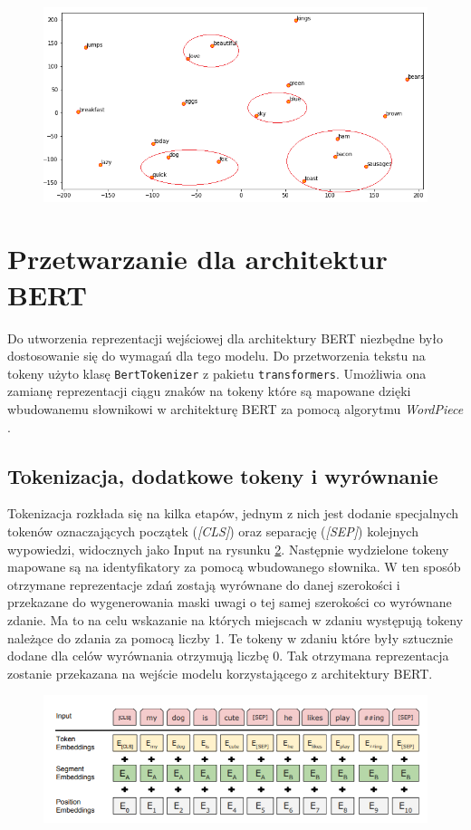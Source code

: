 \begin{figure}[t]
\centering\includegraphics[width=\textwidth]{figures/visualize_glove.png}
\label{rys:visualize_glove}
\end{figure}

\section{Przetwarzanie dla architektur BERT}
\label{section:przetwarzanie_danych_bert}

Do utworzenia reprezentacji wejściowej dla architektury BERT niezbędne było dostosowanie się do wymagań dla tego modelu. Do przetworzenia tekstu na tokeny użyto klasę \texttt{BertTokenizer} z pakietu \texttt{transformers}. Umożliwia ona zamianę reprezentacji ciągu znaków na tokeny które są mapowane dzięki wbudowanemu słownikowi w architekturę BERT za pomocą algorytmu \textit{WordPiece} \cite{wu2016googles}.

\subsection{Tokenizacja, dodatkowe tokeny i wyrównanie}

Tokenizacja rozkłada się na kilka etapów, jednym z nich jest dodanie specjalnych tokenów oznaczających początek (\textit{[CLS]}) oraz separację (\textit{[SEP]}) kolejnych wypowiedzi, widocznych jako Input na rysunku \ref{rys:bert_token}. Następnie wydzielone tokeny mapowane są na identyfikatory za pomocą wbudowanego słownika. W ten sposób otrzymane reprezentacje zdań zostają wyrównane do danej szerokości i przekazane do wygenerowania maski uwagi o tej samej szerokości co wyrównane zdanie. Ma to na celu wskazanie na których miejscach w zdaniu występują tokeny należące do zdania za pomocą liczby 1. Te tokeny w zdaniu które były sztucznie dodane dla celów wyrównania otrzymują liczbę 0. Tak otrzymana reprezentacja zostanie przekazana na wejście modelu korzystającego z architektury BERT.

\begin{figure}[t]
\centering\includegraphics[width=\textwidth]{figures/bert_token.png}
\label{rys:bert_token}
\end{figure}